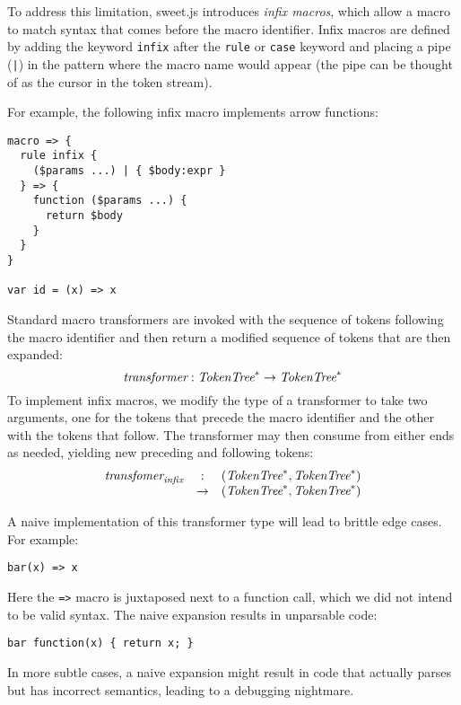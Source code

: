 \documentclass[preprint,10pt]{sigplanconf}
\begin{document}
To address this limitation, sweet.js introduces \emph{infix macros},
which allow a macro to match syntax that comes before the macro
identifier. Infix macros are defined by adding the keyword
\lstinline!infix! after the \lstinline!rule! or \lstinline!case!
keyword and placing a pipe (\lstinline!|!) in the pattern where the
macro name would appear (the pipe can be thought of as the cursor in
the token stream).

For example, the following infix macro implements arrow functions:
\begin{lstlisting}
macro => {
  rule infix {
    ($params ...) | { $body:expr }
  } => {
    function ($params ...) {
      return $body 
    }
  }
}

var id = (x) => x
\end{lstlisting}




Standard macro transformers are invoked with the sequence of tokens
following the macro identifier and then return a modified sequence of
tokens that are then expanded:
\[
\textit{transformer} : \textit{TokenTree}^* \rightarrow \textit{TokenTree}^*
\]
To implement infix macros, we modify the type of a transformer to
take two arguments, one for the tokens that precede the macro
identifier and the other with the tokens that follow. The transformer
may then consume from either ends as needed, yielding new preceding
and following tokens:
\[
\begin{array}{rcl}
  \textit{transfomer}_{\textit{infix}} &:& (\textit{TokenTree}^*, \textit{TokenTree}^*) 
  \\
  &\rightarrow& (\textit{TokenTree}^*, \textit{TokenTree}^*)
\end{array}
\]

A naive implementation of this transformer type will lead to brittle
edge cases. For example:
\begin{lstlisting}
bar(x) => x
\end{lstlisting}
Here the \lstinline!=>! macro is juxtaposed next to a function call,
which we did not intend to be valid syntax. The naive expansion results
in unparsable code:
\begin{lstlisting}
bar function(x) { return x; }
\end{lstlisting}

In more subtle cases, a naive expansion might result in code that
actually parses but has incorrect semantics, leading to a
debugging nightmare.
\end{document}
